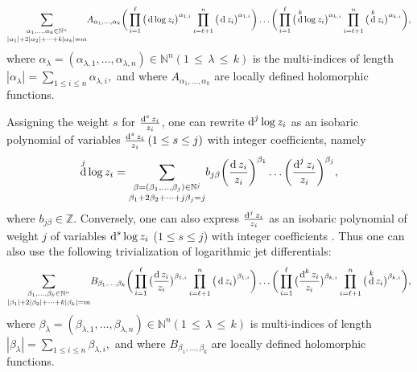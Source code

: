 \documentclass[english, 12pt]{amsart}
\DeclareMathOperator{\dif}{\text{\normalfont d}}
\def\log{\mathrm{log}\,}
\theoremstyle{plain}
\theoremstyle{remark}
\numberwithin{equation}{section}
\theoremstyle{plain}
\theoremstyle{named}
\begin{document}
{\footnotesize
	\begin{equation}
		\label{local expression of log jet}
		\underset{|\alpha_1|+2|\alpha_2|+\dots+k|\alpha_k|=m}
		{\sum_{\alpha_1,\dots,\alpha_k\in\mathbb{N}^n}}
		A_{\alpha_1,\dots,\alpha_k}
		\bigg(
		\prod_{i=1}^{\ell}
		\big(
		\dif\log z_i
		\big)^{\alpha_{1,i}}
		\prod_{i=\ell+1}^{n}
		\big(
		\dif z_i
		\big)
		^{\alpha_{1,i}}
		\bigg)
		\dots
		\bigg(
		\prod_{i=1}^{\ell}
		\big(
		\dif^k\log z_i
		\big)^{\alpha_{k,i}}
		\prod_{i=\ell+1}^{n}
		\big(
		\dif^kz_i
		\big)
		^{\alpha_{k,i}}
		\bigg),
	\end{equation}
}
where $ \alpha_{\lambda}
=
(\alpha_{\lambda,1},\dots,\alpha_{\lambda,n})
\in\mathbb{N}^n
{\scriptstyle{(1\,\leq\,\lambda\,\leq\, k)}}$
is the multi-indices of length $|\alpha_{\lambda}|
=
\sum_{1\leq i\leq n}
\alpha_{\lambda,i},$
and where $A_{\alpha_1,\dots,\alpha_k}$ are locally defined holomorphic functions. 

Assigning the weight $s$ for $\frac{\dif^s z_i}{z_i}$, one can rewrite $\dif^j\log z_i$ as an isobaric polynomial of variables $\frac{\dif^s z_i}{z_i}\, (1\leq s\leq j)$ with integer coefficients, namely
$$
\dif^j\log z_i
=
\underset{\beta_1+2\beta_2+\dots+j\beta_j=j}
{\sum_{\beta=(\beta_1,\dots,\beta_j)\in\mathbb{N}^j}}
b_{j\beta}\bigg(\dfrac{\dif z_i}{z_i}\bigg)^{\beta_1}\dots\bigg(\dfrac{\dif^j z_i}{z_i}\bigg)^{\beta_j},
$$
where $b_{j\beta}\in\mathbb{Z}$. Conversely, one can also express $\frac{\dif^j z_i}{z_i}$ as an isobaric polynomial of weight $j$ of variables $\dif^s\log z_i$ ($1\leq s\leq j$) with integer coefficients \cite{Brotbek-Deng19}. Thus one can also use the following trivialization of logarithmic jet differentials:
{\footnotesize
	\begin{equation}
		\label{local expression of log jet, second form}
		\underset{|\beta_1|+2|\beta_2|+\dots+k|\beta_k|=m}
		{\sum_{\beta_1,\dots,\beta_k\in\mathbb{N}^n}}
		B_{\beta_1,\dots,\beta_k}
		\bigg(
		\prod_{i=1}^{\ell}
		\big(
		\frac{\dif z_i}{z_i}\big)^{\beta_{1,i}}
		\prod_{i=\ell+1}^{n}
		\big(
		\dif z_i
		\big)
		^{\beta_{1,i}}
		\bigg)
		\dots
		\bigg(
		\prod_{i=1}^{\ell}
		\big(\dfrac{
			\dif^k z_i}{z_i}
		\big)^{\beta_{k,i}}
		\prod_{i=\ell+1}^{n}
		\big(
		\dif^kz_i
		\big)
		^{\beta_{k,i}}
		\bigg),
	\end{equation}
}
where $\beta_{\lambda}
=
(\beta_{\lambda,1},\dots,\beta_{\lambda,n})
\in\mathbb{N}^n
{\scriptstyle{(1\,\leq\,\lambda\,\leq\, k)}}$
is multi-indices of length 
$
|\beta_{\lambda}|
=
\sum_{1\leq i\leq n}
\beta_{\lambda,i},
$
and where $B_{\beta_1,\dots,\beta_k}$ are locally defined holomorphic functions. 
\end{document}
